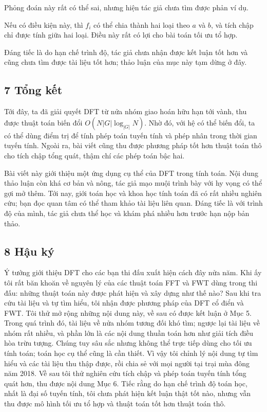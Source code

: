 \documentclass[11pt]{article}
\begin{document}
Phỏng đoán này rất có thể sai, nhưng hiện tác giả chưa tìm được phản ví dụ.

Nếu có điều kiện này, thì \(f_i\) có thể chia thành hai loại theo \(a\) và \(b\),
và tích chập chỉ được tính giữa hai loại. Điều này rất có lợi cho bài toán tối
ưu tổ hợp.

Đáng tiếc là do hạn chế trình độ, tác giả chưa nhận được kết luận tốt hơn và
cũng chưa tìm được tài liệu tốt hơn; thảo luận của mục này tạm dừng ở đây.

\subsection*{7 Tổng kết}

Tới đây, ta đã giải quyết DFT từ nửa nhóm giao hoán hữu hạn tới vành, thu được
thuật toán biến đổi \(O(N|G|\log_{|G|}N)\). Nhờ đó, với hệ có thể biến đổi, ta có
thể dùng điểm trị để tính phép toán tuyến tính và phép nhân trong thời gian
tuyến tính. Ngoài ra, bài viết cũng thu được phương pháp tốt hơn thuật toán thô
cho tích chập tổng quát, thậm chí các phép toán bậc hai.

Bài viết này giới thiệu một ứng dụng cụ thể của DFT trong tính toán. Nội dung
thảo luận còn khá cơ bản và nông, tác giả mạo muội trình bày với hy vọng có thể
gợi mở thêm. Tới nay, giới toán học và khoa học tính toán đã có rất nhiều nghiên
cứu; bạn đọc quan tâm có thể tham khảo tài liệu liên quan. Đáng tiếc là với
trình độ của mình, tác giả chưa thể học và khám phá nhiều hơn trước hạn nộp
bản thảo.

\subsection*{8 Hậu ký}

Ý tưởng giới thiệu DFT cho các bạn thi đấu xuất hiện cách đây nửa năm. Khi ấy
tôi rất băn khoăn về nguyên lý của các thuật toán FFT và FWT dùng trong thi
đấu: những thuật toán này được phát hiện và xây dựng như thế nào? Sau khi tra
cứu tài liệu và tự tìm hiểu, tôi nhận được phương pháp của DFT cổ điển và FWT.
Tôi thử mở rộng những nội dung này, về sau có được kết luận ở Mục 5. Trong quá
trình đó, tài liệu về nửa nhóm tương đối khó tìm; ngược lại tài liệu về nhóm
rất nhiều, và phần lớn là các nội dung thuần toán hơn như giải tích điều hòa
trừu tượng. Chúng tuy sâu sắc nhưng không thể trực tiếp dùng cho tối ưu tính
toán; toán học cụ thể cũng là cần thiết. Vì vậy tôi chỉnh lý nội dung tự tìm
hiểu và các tài liệu thu thập được, rồi chia sẻ với mọi người tại trại mùa đông
năm 2018. Về sau tôi thử nghiên cứu tích chập và phép toán tuyến tính tổng quát
hơn, thu được nội dung Mục 6. Tiếc rằng do hạn chế trình độ toán học, nhất là
đại số tuyến tính, tôi chưa phát hiện kết luận thật tốt nào, nhưng vẫn thu được
mô hình tối ưu tổ hợp và thuật toán tốt hơn thuật toán thô.
\end{document}
